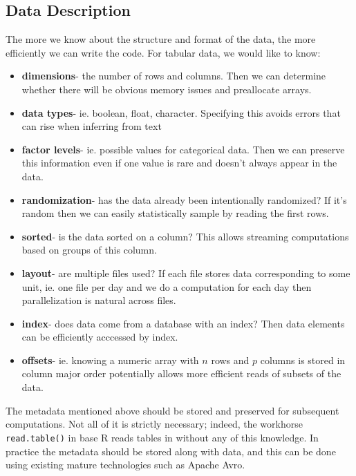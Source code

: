 \documentclass[12pt]{article}
\begin{document}
\subsection{Data Description}

The more we know about the structure and format of the data, the more
efficiently we can write the code. For tabular data, we would like to know:

\begin{itemize}
    \item \textbf{dimensions}- the number of rows and columns. Then we can determine
        whether there will be obvious memory issues and preallocate arrays.
    \item \textbf{data types}- ie. boolean, float, character. Specifying this avoids errors
        that can rise when inferring from text
    \item \textbf{factor levels}- ie. possible values for categorical data.
        Then we can preserve this information even if one value is rare and
        doesn't always appear in the data.
    \item \textbf{randomization}- has the data already been intentionally randomized?
        If it's random then we can easily statistically sample by reading
        the first rows.
    \item \textbf{sorted}- is the data sorted on a column? This allows
        streaming computations based on groups of this column.
    \item \textbf{layout}- are multiple files used? If each file stores
        data corresponding to some unit, ie. one file per day and we do a
        computation for each day then parallelization is natural across
        files.
    \item \textbf{index}- does data come from a database with an index?
        Then data elements can be efficiently acccessed by index.
    \item \textbf{offsets}- ie. knowing a numeric array with $n$ rows and $p$
        columns is stored in column major order potentially allows more
        efficient reads of subsets of the data.
\end{itemize}

The metadata mentioned above should be stored and preserved for subsequent
computations. Not all of it is strictly necessary; indeed, the workhorse
\texttt{read.table()} in base R reads tables in without any of this
knowledge. In practice the metadata should be stored along with data, and
this can be done using existing mature technologies such as Apache Avro.
\end{document}
